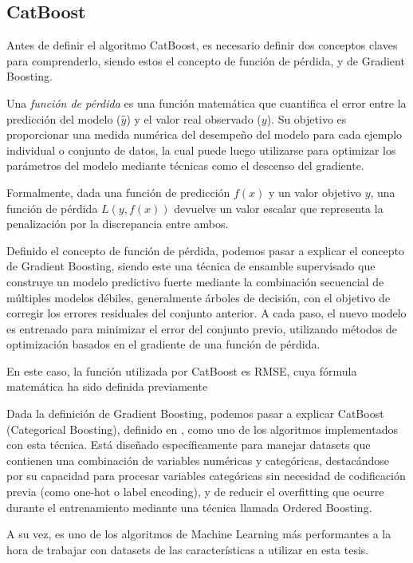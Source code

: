 \subsection{CatBoost}

Antes de definir el algoritmo CatBoost, es necesario definir dos conceptos claves para comprenderlo, siendo estos el concepto de función de pérdida, y de Gradient Boosting.

Una \emph{función de pérdida} es una función matemática que cuantifica el error entre la predicción del modelo ($\hat{y}$) y el valor real observado ($y$). Su objetivo es proporcionar una medida numérica del desempeño del modelo para cada ejemplo individual o conjunto de datos, la cual puede luego utilizarse para optimizar los parámetros del modelo mediante técnicas como el descenso del gradiente.

Formalmente, dada una función de predicción $f(x)$ y un valor objetivo $y$, una función de pérdida $L(y, f(x))$ devuelve un valor escalar que representa la penalización por la discrepancia entre ambos.

Definido el concepto de función de pérdida, podemos pasar a explicar el concepto de Gradient Boosting, siendo este una técnica de ensamble supervisado que construye un modelo predictivo fuerte mediante la combinación secuencial de múltiples modelos débiles, generalmente árboles de decisión, con el objetivo de corregir los errores residuales del conjunto anterior. A cada paso, el nuevo modelo es entrenado para minimizar el error del conjunto previo, utilizando métodos de optimización basados en el gradiente de una función de pérdida.

En este caso, la función utilizada por CatBoost es RMSE, cuya fórmula matemática ha sido definida previamente

Dada la definición de Gradient Boosting, podemos pasar a explicar CatBoost (Categorical Boosting), definido en \parencite{dorogush2018catboost}, como uno de los algoritmos implementados con esta técnica. Está diseñado específicamente para manejar datasets que contienen una combinación de variables numéricas y categóricas, destacándose por su capacidad para procesar variables categóricas sin necesidad de codificación previa (como one-hot o label encoding), y de reducir el overfitting que ocurre durante el entrenamiento mediante una técnica llamada Ordered Boosting. 

A su vez, es uno de los algoritmos de Machine Learning más performantes a la hora de trabajar con datasets de las características a utilizar en esta tesis.